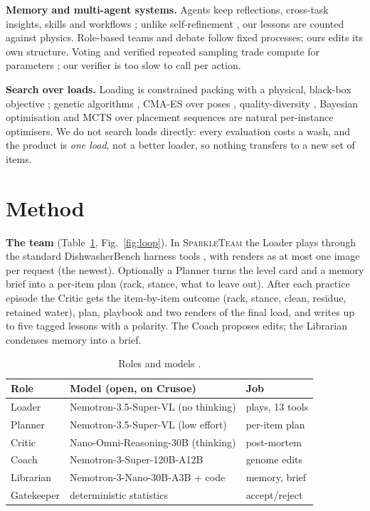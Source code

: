 \documentclass[9pt,twocolumn,letterpaper]{extarticle}
\newcommand{\ST}{\textsc{SparkleTeam}}
\begin{document}
\textbf{Memory and multi-agent systems.} Agents keep reflections, cross-task insights, skills and
workflows \citep{shinn2023reflexion,zhao2023expel,majumder2023clin,wang2023voyager,wang2024awm,park2023generative,packer2023memgpt};
unlike self-refinement \citep{madaan2023selfrefine}, our lessons are counted against physics. Role-based teams
\citep{wu2023autogen,hong2023metagpt,li2023camel,qian2023chatdev} and debate \citep{du2023debate}
follow fixed processes; ours edits its own structure. Voting and verified repeated sampling trade
compute for parameters \citep{li2024moreagents,brown2024monkeys,snell2024ttc}; our verifier is too slow to call per action.

\textbf{Search over loads.} Loading is constrained packing with a physical, black-box objective
\citep{wang2019stable,zhao2021online}; genetic algorithms \citep{holland1975adaptation,goldberg1989genetic},
CMA-ES over poses \citep{hansen2001cmaes}, quality-diversity \citep{mouret2015mapelites}, Bayesian
optimisation \citep{snoek2012practical} and MCTS over placement sequences
\citep{kocsis2006uct,browne2012mcts} are natural per-instance optimisers. We do not search loads
directly: every evaluation costs a wash, and the product is \emph{one load}, not a better loader,
so nothing transfers to a new set of items.

\section{Method}
\textbf{The team} (Table~\ref{tab:team}, Fig.~\ref{fig:loop}). In \ST{} the Loader plays through the
standard DishwasherBench harness tools \citep{composo2026dishwasherbench}, with renders as at most one image per request (the newest). Optionally a
Planner turns the level card and a memory brief into a per-item plan (rack, stance, what to leave
out). After each practice episode the Critic gets the item-by-item outcome (rack, stance, clean,
residue, retained water), plan, playbook and two renders of the final load, and writes up to five
tagged lessons with a polarity. The Coach
proposes edits; the Librarian condenses memory into a brief.

\begin{table}[t]
\centering\footnotesize
\setlength{\tabcolsep}{3pt}
\begin{tabular}{@{}lll@{}}
\toprule
Role & Model (open, on Crusoe) & Job \\
\midrule
Loader & Nemotron-3.5-Super-VL (no thinking) & plays, 13 tools \\
Planner & Nemotron-3.5-Super-VL (low effort) & per-item plan \\
Critic & Nano-Omni-Reasoning-30B (thinking) & post-mortem \\
Coach & Nemotron-3-Super-120B-A12B & genome edits \\
Librarian & Nemotron-3-Nano-30B-A3B + code & memory, brief \\
Gatekeeper & deterministic statistics & accept/reject \\
\bottomrule
\end{tabular}
\caption{Roles and models \citep{nvidia2025nemotron3,nvidia2025nemotron3nano,nvidia2026nemotron3super}.}
\label{tab:team}
\end{table}
\end{document}
